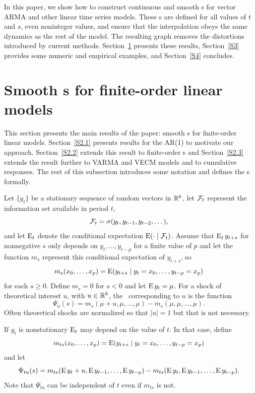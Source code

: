 \documentclass[12pt,fleqn]{article}
\begin{document}
In this paper, we show how to construct continuous and smooth \IRF s
for vector ARMA and other linear time series models. These \IRF s are
defined for all values of $t$ and $s$, even noninteger values, and
ensure that the interpolation obeys the same dynamics as the rest of
the model. The resulting graph removes the distortions introduced by
current methods.  Section~\ref{S2} presents these results,
Section~\ref{S3} provides some numeric and empirical examples, and
Section~\ref{S4} concludes.

\section{Smooth \IRF s for finite-order linear models}
\label{S2}

This section presents the main results of the paper: smooth \IRF s for
finite-order linear models. Section~\ref{S2.1} presents results for
the AR(1) to motivate our approach. Section~\ref{S2.2} extends this
result to finite-order \VAR s and Section~\ref{S2.3} extends the
result further to VARMA and VECM models and to cumulative responses.
The rest of this subsection introduces some notation and defines the
\IRF s formally.

Let $\{y_t\}$ be a stationary sequence of random vectors in $\mathbb{R}^k$,
let $\mathcal{F}_t$ represent the information set available in period $t$,
\begin{equation*}
  \mathcal{F}_t = \sigma(y_t, y_{t-1}, y_{t-2},\dots),
\end{equation*}
and let $\operatorname{E}_t$ denote the conditional expectation
$\operatorname{E}(\cdot \mid \mathcal{F}_t)$. Assume that $\operatorname{E}_t y_{t+s}$ for
nonnegative $s$ only depends on $y_t,\dots,y_{t-p}$ for a finite value
of $p$ and let the function $m_s$ represent this conditional
expectation of $y_{t+s}$, so
\begin{equation*}
  m_s(x_0,\dots,x_p)
  = \operatorname{E}(y_{t+s} \mid y_t = x_0,\dots, y_{t-p} = x_p)
\end{equation*}
for each $s \geq 0$. Define $m_s = 0$ for $s < 0$ and let
$\operatorname{E} y_t = \mu$. For a shock of theoretical interest $u$, with
$u \in \mathbb{R}^k$, the \IRF\ corresponding to $u$ is the function
\[
  \Psi_u(s) =
  m_s(\mu + u, \mu, \dots, \mu) - m_s(\mu, \mu, \dots,\mu).
\]
Often theoretical shocks are normalized so that $\lvert u \rvert = 1$
but that is not necessary.

If $y_t$ is nonstationary $\operatorname{E}_t$ may depend on the value of $t$. In that
case, define
\begin{equation*}
  m_{ts}(x_0,\dots,x_p)
  = \operatorname{E}(y_{t+s} \mid y_t = x_0,\dots, y_{t-p} = x_p)
\end{equation*}
and let
\begin{equation*}
  \Psi_{tu}(s) =
  m_{ts}(\operatorname{E} y_t + u, \operatorname{E} y_{t-1}, \dots, \operatorname{E} y_{t-p}) - m_{ts}(\operatorname{E} y_t, \operatorname{E} y_{t-1}, \dots,\operatorname{E} y_{t-p}).
\end{equation*}
Note that $\Psi_{tu}$ can be independent of $t$ even if $m_{ts}$ is
not.
\end{document}
